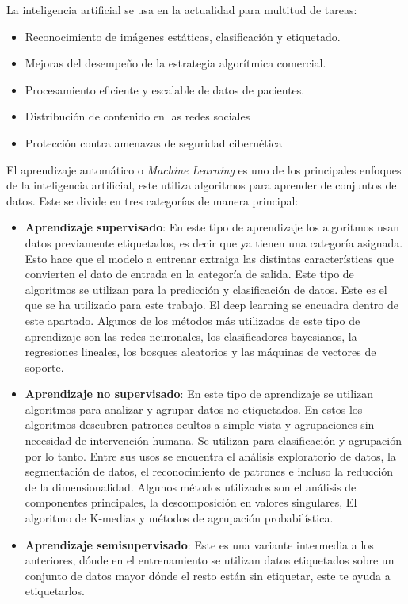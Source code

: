 La inteligencia artificial se usa en la actualidad para multitud de tareas:

\begin{itemize}
	\item Reconocimiento de imágenes estáticas, clasificación y etiquetado.
	
	\item Mejoras del desempeño de la estrategia algorítmica comercial.
	
	\item Procesamiento eficiente y escalable de datos de pacientes.
	
	\item Distribución de contenido en las redes sociales
	
	\item Protección contra amenazas de seguridad cibernética
	
\end{itemize}

El aprendizaje automático o \textit{Machine Learning} \cite{ibmQuMachine} es uno de los principales enfoques de la inteligencia artificial, este utiliza algoritmos para aprender de conjuntos de datos. Este se divide en tres categorías de manera principal:

\begin{itemize}
	\item\textbf{Aprendizaje supervisado}: En este tipo de aprendizaje los algoritmos usan datos previamente etiquetados, es decir que ya tienen una categoría asignada. Esto hace que el modelo a entrenar extraiga las distintas características que convierten el dato de entrada en la categoría de salida. Este tipo de algoritmos se utilizan para la predicción y clasificación de datos. Este es el que se ha utilizado para este trabajo. El deep learning se encuadra dentro de este apartado. Algunos de los métodos más utilizados de este tipo de aprendizaje son las redes neuronales, los clasificadores bayesianos, la regresiones lineales, los bosques aleatorios y las máquinas de vectores de soporte.
	
	\item\textbf{Aprendizaje no supervisado}: En este tipo de aprendizaje se utilizan algoritmos para analizar y agrupar datos no etiquetados. En estos los algoritmos descubren patrones ocultos a simple vista y agrupaciones sin necesidad de intervención humana. Se utilizan para clasificación y agrupación por lo tanto. Entre sus usos se encuentra el análisis exploratorio de datos, la segmentación de datos, el reconocimiento de patrones e incluso la reducción de la dimensionalidad. Algunos métodos utilizados son el análisis de componentes principales, la descomposición en valores singulares, El algoritmo de K-medias y métodos de agrupación probabilística.
	
	\item\textbf{Aprendizaje semisupervisado}:  Este es una variante intermedia a los anteriores, dónde en el entrenamiento se utilizan datos etiquetados sobre un conjunto de datos mayor dónde el resto están sin etiquetar, este te ayuda a etiquetarlos.

\end{itemize}

